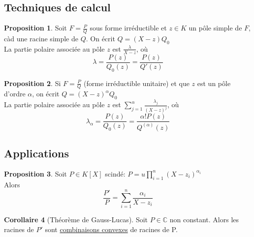 \documentclass[10pt,a4paper]{article}
\theoremstyle{definition}
\newtheorem{proposition}{Proposition}[section]
\newtheorem{corollaire}[proposition]{Corollaire}
\begin{document}
\subsection{Techniques de calcul}
\begin{proposition}
Soit $F = \frac{P}{Q}$ sous forme irréductible et $z \in K$ un pôle simple de $F$, càd une racine simple de $Q$. On écrit $Q = (X - z) Q_0$ \\
La partie polaire associée au pôle $z$ est $\frac{\lambda}{X - z}$, où
\[\lambda = \frac{P(z)}{Q_0(z)} = \frac{P(z)}{Q'(z)}\]
\end{proposition}
\begin{proposition}
Si $F = \frac{P}{Q}$ (forme irréductible unitaire) et que $z$ est un pôle d'ordre $\alpha$, on écrit $Q = (X - z)^\alpha Q_0$ \\
La partie polaire associée au pôle $z$ est $\sum\limits_{j = 1}^\alpha \frac{\lambda_j}{(X - z)^j}$, où
\[\lambda_\alpha = \frac{P(z)}{Q_0(z)} = \frac{\alpha! P(z)}{Q^{(\alpha)}(z)}\]
\end{proposition}

\subsection{Applications}
\begin{proposition}
Soit $P \in K[X]$ scindé: $P = u \prod\limits_{i = 1}^n (X - z_i)^{\alpha_i}$ \\
Alors
\[\frac{P'}{P} = \sum\limits_{i = 1}^n \frac{\alpha_i}{X - z_i}\]
\end{proposition}
\begin{corollaire}[Théorème de Gauss-Lucas]
Soit $P \in \mathbb{C}$ non constant. Alors les racines de $P'$ sont \uline{combinaisons convexes} de racines de P.
\end{corollaire}
\end{document}
